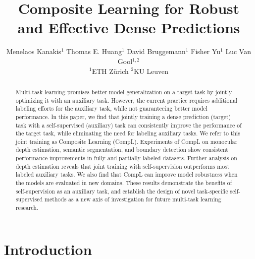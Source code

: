 \documentclass[10pt,twocolumn,letterpaper]{article}
\begin{document}
\title{Composite Learning for Robust and Effective Dense Predictions}

\author{Menelaos Kanakis$^{1}$\quad
    Thomas E. Huang$^{1}$\quad
    David Bruggemann$^{1}$\quad
    Fisher Yu$^{1}$\quad
	Luc Van Gool$^{1,2}$ \vspace{2mm} \\
$^1$ETH Z\"urich \quad $^2$KU Leuven
}

\maketitle
\thispagestyle{empty}

\begin{abstract}
Multi-task learning promises better model generalization on a target task by jointly optimizing it with an auxiliary task. 
However, the current practice requires additional labeling efforts for the auxiliary task, while not guaranteeing better model performance.
In this paper, we find that jointly training a dense prediction (target) task with a self-supervised (auxiliary) task can consistently improve the performance of the target task, while eliminating the need for labeling auxiliary tasks. 
We refer to this joint training as Composite Learning (CompL). 
Experiments of CompL on monocular depth estimation, semantic segmentation, and boundary detection show consistent performance improvements in fully and partially labeled datasets. 
Further analysis on depth estimation reveals that joint training with self-supervision outperforms most labeled auxiliary tasks. 
We also find that CompL can improve model robustness when the models are evaluated in new domains.
These results demonstrate the benefits of self-supervision as an auxiliary task, and establish the design of novel task-specific self-supervised methods as a new axis of investigation for future multi-task learning research.
\end{abstract}
 \section{Introduction}
\end{document}
